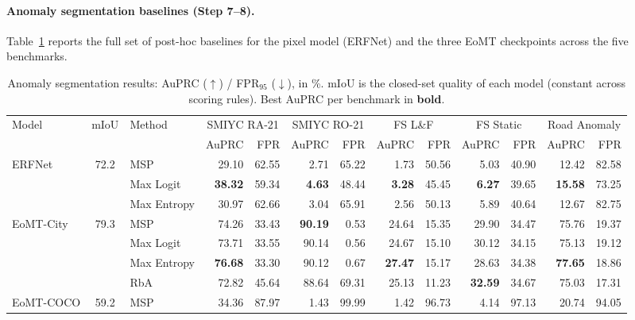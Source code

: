 \documentclass[10pt,twocolumn]{article}
\begin{document}
\paragraph{Anomaly segmentation baselines (Step 7--8).}
Table~\ref{tab:anomaly} reports the full set of post-hoc baselines for the
pixel model (ERFNet) and the three EoMT checkpoints across the five benchmarks.

\begin{table}[t]
\centering
\caption{Anomaly segmentation results: AuPRC ($\uparrow$) / FPR$_{95}$
($\downarrow$), in \%. mIoU is the closed-set quality of each model (constant
across scoring rules). Best AuPRC per benchmark in \textbf{bold}.}
\label{tab:anomaly}
\scriptsize
\setlength{\tabcolsep}{4pt}
\begin{tabular}{l c l rr rr rr rr rr}
\toprule
\multirow{2}{*}{Model} & \multirow{2}{*}{mIoU} & \multirow{2}{*}{Method}
& \multicolumn{2}{c}{SMIYC RA-21} & \multicolumn{2}{c}{SMIYC RO-21}
& \multicolumn{2}{c}{FS L\&F} & \multicolumn{2}{c}{FS Static}
& \multicolumn{2}{c}{Road Anomaly} \\
\cmidrule(lr){4-5}\cmidrule(lr){6-7}\cmidrule(lr){8-9}\cmidrule(lr){10-11}\cmidrule(lr){12-13}
 & & & AuPRC & FPR & AuPRC & FPR & AuPRC & FPR & AuPRC & FPR & AuPRC & FPR \\
\midrule
\multirow{3}{*}{ERFNet} & \multirow{3}{*}{72.2}
 & MSP        & 29.10 & 62.55 & 2.71 & 65.22 & 1.73 & 50.56 & 5.03 & 40.90 & 12.42 & 82.58 \\
 & & Max Logit  & \textbf{38.32} & 59.34 & \textbf{4.63} & 48.44 & \textbf{3.28} & 45.45 & \textbf{6.27} & 39.65 & \textbf{15.58} & 73.25 \\
 & & Max Entropy& 30.97 & 62.66 & 3.04 & 65.91 & 2.56 & 50.13 & 5.89 & 40.64 & 12.67 & 82.75 \\
\midrule
\multirow{4}{*}{EoMT-City} & \multirow{4}{*}{79.3}
 & MSP        & 74.26 & 33.43 & \textbf{90.19} & 0.53 & 24.64 & 15.35 & 29.90 & 34.47 & 75.76 & 19.37 \\
 & & Max Logit  & 73.71 & 33.55 & 90.14 & 0.56 & 24.67 & 15.10 & 30.12 & 34.15 & 75.13 & 19.12 \\
 & & Max Entropy& \textbf{76.68} & 33.30 & 90.12 & 0.67 & \textbf{27.47} & 15.17 & 28.63 & 34.38 & \textbf{77.65} & 18.86 \\
 & & RbA        & 72.82 & 45.64 & 88.64 & 69.31 & 25.13 & 11.23 & \textbf{32.59} & 34.67 & 75.03 & 17.31 \\
\midrule
\multirow{4}{*}{EoMT-COCO} & \multirow{4}{*}{59.2}
 & MSP        & 34.36 & 87.97 & 1.43 & 99.99 & 1.42 & 96.73 & 4.14 & 97.13 & 20.74 & 94.05 \\

\end{tabular}
\end{table}
\end{document}
